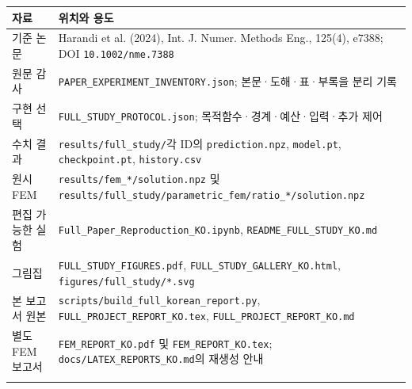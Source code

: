 \documentclass[10pt,a4paper]{article}
\begin{document}
\par\begin{minipage}{\linewidth}\begin{tabular}{>{\raggedright\arraybackslash}p{}>{\raggedright\arraybackslash}p{}}

\rowcolor{tint} \textbf{자료} & \textbf{위치와 용도}\\\midrule

기준 논문 & Harandi et al. (2024), Int. J. Numer. Methods Eng., 125(4), e7388; DOI \nolinkurl{10.1002/nme.7388}\\\addlinespace[2pt]

원문 감사 & \nolinkurl{PAPER_EXPERIMENT_INVENTORY.json}; 본문·도해·표·부록을 분리 기록\\\addlinespace[2pt]

구현 선택 & \nolinkurl{FULL_STUDY_PROTOCOL.json}; 목적함수·경계·예산·입력·추가 제어\\\addlinespace[2pt]

수치 결과 & \nolinkurl{results/full_study/}각 ID의 \nolinkurl{prediction.npz}, \nolinkurl{model.pt}, \nolinkurl{checkpoint.pt}, \nolinkurl{history.csv}\\\addlinespace[2pt]

원시 FEM & \nolinkurl{results/fem_*/solution.npz} 및 \nolinkurl{results/full_study/parametric_fem/ratio_*/solution.npz}\\\addlinespace[2pt]

편집 가능한 실험 & \nolinkurl{Full_Paper_Reproduction_KO.ipynb}, \nolinkurl{README_FULL_STUDY_KO.md}\\\addlinespace[2pt]

그림집 & \nolinkurl{FULL_STUDY_FIGURES.pdf}, \nolinkurl{FULL_STUDY_GALLERY_KO.html}, \nolinkurl{figures/full_study/*.svg}\\\addlinespace[2pt]

본 보고서 원본 & \nolinkurl{scripts/build_full_korean_report.py}, \nolinkurl{FULL_PROJECT_REPORT_KO.tex}, \nolinkurl{FULL_PROJECT_REPORT_KO.md}\\\addlinespace[2pt]

별도 FEM 보고서 & \nolinkurl{FEM_REPORT_KO.pdf} 및 \nolinkurl{FEM_REPORT_KO.tex}; \nolinkurl{docs/LATEX_REPORTS_KO.md}의 재생성 안내\\\addlinespace[2pt]

\bottomrule\end{tabular}\end{minipage}\par\vspace{5pt}\endgroup
\end{document}
